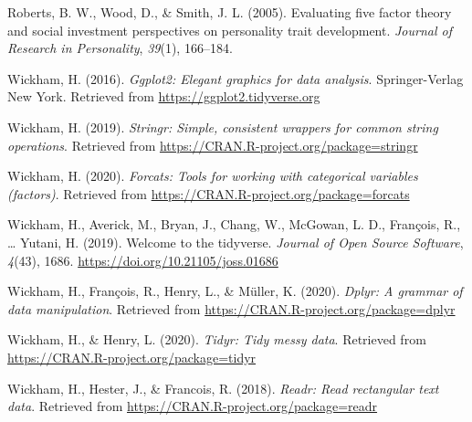 \documentclass[
  english,
  man,floatsintext]{apa6}
\begin{document}
\leavevmode\hypertarget{ref-roberts2005}{}%
Roberts, B. W., Wood, D., \& Smith, J. L. (2005). Evaluating five factor theory and social investment perspectives on personality trait development. \emph{Journal of Research in Personality}, \emph{39}(1), 166--184.

\leavevmode\hypertarget{ref-R-ggplot2}{}%
Wickham, H. (2016). \emph{Ggplot2: Elegant graphics for data analysis}. Springer-Verlag New York. Retrieved from \url{https://ggplot2.tidyverse.org}

\leavevmode\hypertarget{ref-R-stringr}{}%
Wickham, H. (2019). \emph{Stringr: Simple, consistent wrappers for common string operations}. Retrieved from \url{https://CRAN.R-project.org/package=stringr}

\leavevmode\hypertarget{ref-R-forcats}{}%
Wickham, H. (2020). \emph{Forcats: Tools for working with categorical variables (factors)}. Retrieved from \url{https://CRAN.R-project.org/package=forcats}

\leavevmode\hypertarget{ref-R-tidyverse}{}%
Wickham, H., Averick, M., Bryan, J., Chang, W., McGowan, L. D., François, R., \ldots{} Yutani, H. (2019). Welcome to the tidyverse. \emph{Journal of Open Source Software}, \emph{4}(43), 1686. \url{https://doi.org/10.21105/joss.01686}

\leavevmode\hypertarget{ref-R-dplyr}{}%
Wickham, H., François, R., Henry, L., \& Müller, K. (2020). \emph{Dplyr: A grammar of data manipulation}. Retrieved from \url{https://CRAN.R-project.org/package=dplyr}

\leavevmode\hypertarget{ref-R-tidyr}{}%
Wickham, H., \& Henry, L. (2020). \emph{Tidyr: Tidy messy data}. Retrieved from \url{https://CRAN.R-project.org/package=tidyr}

\leavevmode\hypertarget{ref-R-readr}{}%
Wickham, H., Hester, J., \& Francois, R. (2018). \emph{Readr: Read rectangular text data}. Retrieved from \url{https://CRAN.R-project.org/package=readr}

\endgroup
\end{document}
